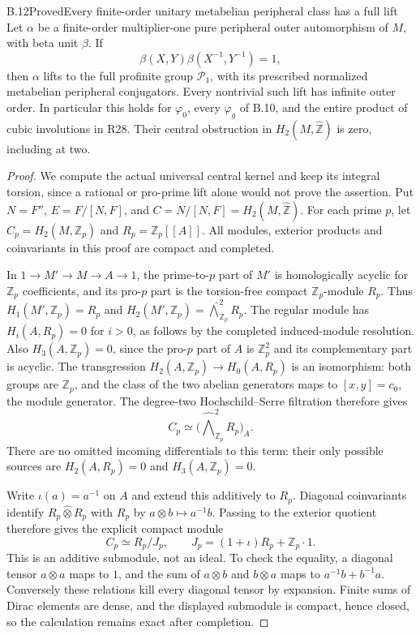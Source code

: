 \begin{statement}{B.12}{Proved}{Every finite-order unitary metabelian peripheral class has a full lift}
Let $\alpha$ be a finite-order multiplier-one pure peripheral
outer automorphism of $M$, with beta unit $\beta$. If
\[
                    \beta(X,Y)\beta(X^{-1},Y^{-1})=1,
\]
then $\alpha$ lifts to the full profinite group $\mathcal P_1$,
with its prescribed normalized metabelian peripheral conjugators.
Every nontrivial such lift has infinite outer order.
In particular this holds for $\varphi_0$, every $\varphi_g$ of B.10,
and the entire product of cubic involutions in R28. Their central
obstruction in $H_2(M,\widehat{\mathbb Z})$ is zero, including at two.
\end{statement}
\begin{proof}
We compute the actual universal central kernel and keep its
integral torsion, since a rational or pro-prime lift alone would
not prove the assertion. Put $N=F''$, $E=F/[N,F]$, and
$C=N/[N,F]=H_2(M,\widehat{\mathbb Z})$.
For each prime $p$, let $C_p=H_2(M,\mathbb Z_p)$ and
$R_p=\mathbb Z_p[[A]]$. All modules, exterior products and
coinvariants in this proof are compact and completed.

In $1\to M'\to M\to A\to1$, the prime-to-$p$ part of $M'$
is homologically acyclic for $\mathbb Z_p$ coefficients, and its
pro-$p$ part is the torsion-free compact $\mathbb Z_p$-module $R_p$.
Thus $H_1(M',\mathbb Z_p)=R_p$ and
$H_2(M',\mathbb Z_p)=\widehat\bigwedge^2_{\mathbb Z_p}R_p$.
The regular module has $H_i(A,R_p)=0$ for $i>0$, as follows
by the completed induced-module resolution. Also
$H_3(A,\mathbb Z_p)=0$, since the pro-$p$ part of $A$ is
$\mathbb Z_p^2$ and its complementary part is acyclic. The
transgression $H_2(A,\mathbb Z_p)\to H_0(A,R_p)$ is an
isomorphism: both groups are $\mathbb Z_p$, and the class of
the two abelian generators maps to $[x,y]=c_0$, the module generator.
The degree-two Hochschild--Serre filtration therefore gives
\[
 C_p\simeq
 \bigl(\widehat\bigwedge^2_{\mathbb Z_p}R_p\bigr)_A.
\]
There are no omitted incoming differentials to this term: their
only possible sources are $H_2(A,R_p)=0$ and
$H_3(A,\mathbb Z_p)=0$.

Write $\iota(a)=a^{-1}$ on $A$ and extend this additively to $R_p$.
Diagonal coinvariants identify
$R_p\widehat\otimes R_p$ with $R_p$ by
$a\otimes b\mapsto a^{-1}b$. Passing to the exterior quotient
therefore gives the explicit compact module
\[
 C_p\simeq R_p/J_p,\qquad
 J_p=(1+\iota)R_p+\mathbb Z_p\cdot1.
 \tag{B.12.1}
\]
This is an additive submodule, not an ideal. To check the equality,
a diagonal tensor $a\otimes a$ maps to $1$, and the sum of
$a\otimes b$ and $b\otimes a$ maps to
$a^{-1}b+b^{-1}a$. Conversely these relations kill every diagonal
tensor by expansion. Finite sums of Dirac elements are dense,
and the displayed submodule is compact, hence closed, so the
calculation remains exact after completion.


\end{proof}
